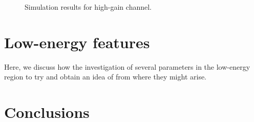 						\begin{sidewaysfigure}
							\centering
							\caption{Simulation results for high-gain channel.}
							\label{fig:RTSimHighGainResults}
						\end{sidewaysfigure}


	\section{Low-energy features}
	\label{sec:BeGeLowEnergyFeatures}
	
	Here, we discuss how the investigation of several parameters in the low-energy region to try and obtain an idea of from where they might arise.


	\section{Conclusions}
     	\label{sec:CutConclusions}				


